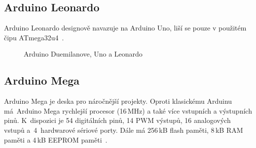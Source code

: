 		\subsection{Arduino Leonardo} 
		Arduino Leonardo designově navazuje na Arduino Uno, liší se pouze v použitém čipu ATmega32u4~\cite{ArduinoLeonardo}.


\begin{figure}[!ht]
    \centering
			\hspace*{5mm}
			\hspace*{5mm}
    \caption{Arduino Duemilanove, Uno a Leonardo}
		\vspace{-10pt}	
\end{figure}


\newpage
	
					\subsection{Arduino Mega} 
					Arduino Mega je deska pro náročnější projekty. Oproti klasickému Arduinu má~Arduino Mega rychlejší procesor (16\,MHz) a také více vstupních a výstupních pinů. K~dispozici je 54 digitálních pinů, 14 PWM výstupů, 16 analogových vstupů a~4~hardwarové sériové porty. Dále má 256\,kB flash paměti, 8\,kB RAM paměti a 4\,kB EEPROM paměti~\cite{ArduinoMega}.	
			
